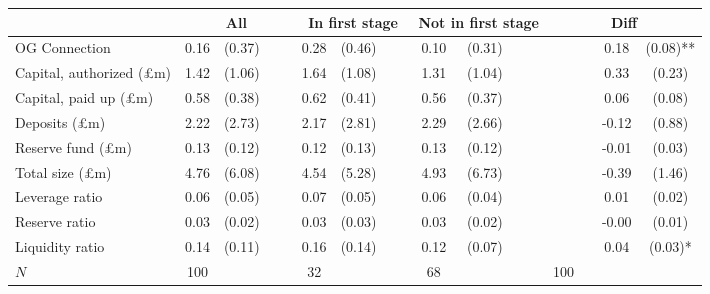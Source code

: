 {
\def\sym#1{\ifmmode^{#1}\else\(^{#1}\)\fi}
\begin{tabular}{l*{4}{cccc}}
\toprule
          &\multicolumn{4}{c}{All}                   &\multicolumn{4}{c}{In first stage}        &\multicolumn{4}{c}{Not in first stage}    &\multicolumn{4}{c}{Diff}                  \\
\midrule
OG Connection&     0.16&   (0.37)&         &            &     0.28&   (0.46)&         &            &     0.10&   (0.31)&         &            &         &         &     0.18&   (0.08)** \\\hline
Capital, authorized (\pounds m)&     1.42&   (1.06)&         &            &     1.64&   (1.08)&         &            &     1.31&   (1.04)&         &            &         &         &     0.33&   (0.23)   \\
Capital, paid up (\pounds m)&     0.58&   (0.38)&         &            &     0.62&   (0.41)&         &            &     0.56&   (0.37)&         &            &         &         &     0.06&   (0.08)   \\
Deposits (\pounds m)&     2.22&   (2.73)&         &            &     2.17&   (2.81)&         &            &     2.29&   (2.66)&         &            &         &         &    -0.12&   (0.88)   \\
Reserve fund (\pounds m)&     0.13&   (0.12)&         &            &     0.12&   (0.13)&         &            &     0.13&   (0.12)&         &            &         &         &    -0.01&   (0.03)   \\
Total size (\pounds m)&     4.76&   (6.08)&         &            &     4.54&   (5.28)&         &            &     4.93&   (6.73)&         &            &         &         &    -0.39&   (1.46)   \\
Leverage ratio&     0.06&   (0.05)&         &            &     0.07&   (0.05)&         &            &     0.06&   (0.04)&         &            &         &         &     0.01&   (0.02)   \\
Reserve ratio&     0.03&   (0.02)&         &            &     0.03&   (0.03)&         &            &     0.03&   (0.02)&         &            &         &         &    -0.00&   (0.01)   \\
Liquidity ratio&     0.14&   (0.11)&         &            &     0.16&   (0.14)&         &            &     0.12&   (0.07)&         &            &         &         &     0.04&   (0.03)*  \\
\midrule
\(N\)     &      100&         &         &            &       32&         &         &            &       68&         &         &            &      100&         &         &            \\
\bottomrule
\end{tabular}
}
